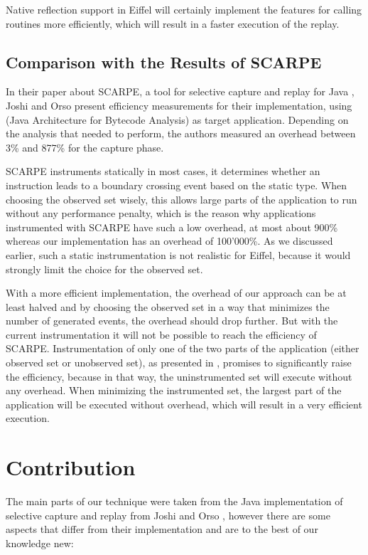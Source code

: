 Native reflection support in Eiffel will certainly implement the features for calling routines more efficiently, which will result in a faster execution of the replay.


\subsection{Comparison with the Results of SCARPE}
In their paper about SCARPE, a tool for selective capture and replay for Java \cite{orso05may}, Joshi and Orso present efficiency measurements for their implementation, using  (Java Architecture for Bytecode Analysis) as target application. Depending on the analysis that  needed to perform, the authors measured an overhead between 3\% and 877\% for the capture phase.

SCARPE instruments statically in most cases, it determines whether an instruction leads to a boundary crossing event based on the static type. When choosing the observed set wisely, this allows large parts of the application to run without any performance penalty, which is the reason why applications instrumented with SCARPE have such a low overhead, at most about 900\% whereas our implementation has an overhead of 100'000\%. As we discussed earlier, such a static instrumentation is not realistic for Eiffel, because it would strongly limit the choice for the observed set.

 With a more efficient implementation, the overhead of our approach can be at least halved and by choosing the observed set in a way that minimizes the number of generated events, the overhead should drop further. But with the current instrumentation it will not be possible to reach the efficiency of SCARPE. Instrumentation of only one of the two parts of the application (either observed set or unobserved set), as presented in , promises to significantly raise the efficiency, because in that way, the uninstrumented set will execute without any overhead. When minimizing the instrumented set, the largest part of the application will be executed without overhead, which will result in a very efficient execution.

\section{Contribution}
The main parts of our technique were taken from the Java implementation of selective capture and replay from Joshi and Orso \cite{orso05may}, however there are some aspects that differ from their implementation and are to the best of our knowledge new:

